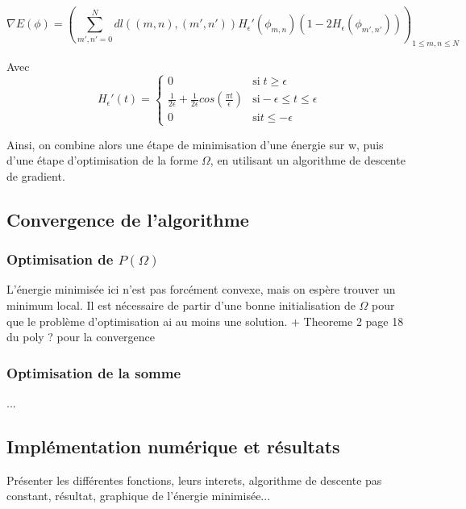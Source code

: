 \[ \nabla E (\phi) = ( \sum \limits_{m',n' = 0}^N dl((m,n),(m',n')) H_{\epsilon}' (\phi_{m,n}) ( 1 - 2H_{\epsilon}(\phi_{m',n'}))  ) _{1 \leq m,n \leq N} \] 

Avec 
\[ H_{\epsilon}' (t) = \left\{ \begin{matrix}
0 & \text{si} \; t \geq \epsilon \\
\frac{1}{2 \epsilon} + \frac{1}{2 \epsilon} cos(\frac{\pi t}{\epsilon}) & \text{si} -\epsilon \leq t \leq \epsilon \\
0 & \text{si} t \leq - \epsilon 
\end{matrix} \right. \] 


Ainsi, on combine alors une étape de minimisation d'une énergie sur w, puis d'une étape d'optimisation de la forme $\Omega$, en utilisant un algorithme de descente de gradient. 
\subsection{Convergence de l'algorithme}

\subsubsection{Optimisation de $P(\Omega)$}

L'énergie minimisée ici n'est pas forcément convexe, mais on espère trouver un minimum local. Il est nécessaire de partir d'une bonne initialisation de $\Omega$ pour que le problème d'optimisation ai au moins une solution. 
+ Theoreme 2 page 18 du poly ? pour la convergence 

\subsubsection{Optimisation de la somme}
...
\subsection{Implémentation numérique et résultats}

Présenter les différentes fonctions, leurs interets, algorithme de descente pas constant, résultat, graphique de l'énergie minimisée...